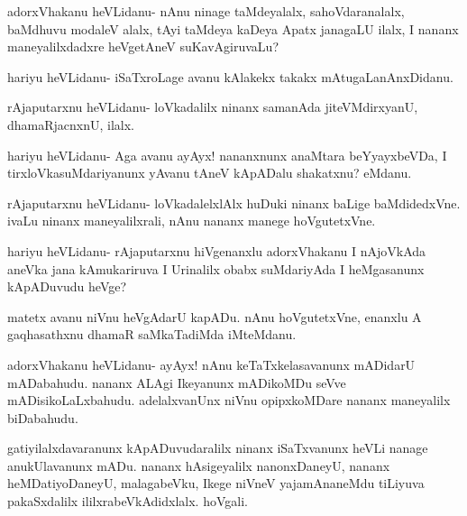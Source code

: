 \documentclass{article}
\begin{document}
\begin{mng}%
adorxVhakanu heVLidanu- nAnu ninage taMdeyalalx, sahoVdaranalalx,
baMdhuvu modaleV alalx, tAyi taMdeya kaDeya Apatx janagaLU ilalx,
I nananx maneyalilxdadxre heVgetAneV suKavAgiruvaLu?
\end{mng}

\begin{mng}%
hariyu heVLidanu- iSaTxroLage avanu kAlakekx takakx mAtugaLanAnxDidanu.
\end{mng}

\begin{mng}%
rAjaputarxnu heVLidanu- loVkadalilx ninanx samanAda jiteVMdirxyanU, dhamaRjacnxnU, ilalx.
\end{mng}

\begin{mng}%
hariyu heVLidanu- Aga avanu ayAyx! nananxnunx anaMtara
beYyayxbeVDa, I tirxloVkasuMdariyanunx yAvanu tAneV kApADalu shakatxnu? eMdanu.
\end{mng}

\begin{mng}%
rAjaputarxnu heVLidanu- loVkadalelxlAlx huDuki ninanx baLige
baMdidedxVne. ivaLu ninanx maneyalilxrali, nAnu nananx manege hoVgutetxVne.
\end{mng}

\begin{mng}%
hariyu heVLidanu- rAjaputarxnu hiVgenanxlu adorxVhakanu
I nAjoVkAda aneVka jana kAmukariruva I Urinalilx obabx 
suMdariyAda I heMgasanunx kApADuvudu heVge?
\end{mng}

\begin{mng}%
matetx avanu niVnu heVgAdarU kapADu. nAnu hoVgutetxVne, 
enanxlu A gaqhasathxnu dhamaR saMkaTadiMda iMteMdanu.
\end{mng}

\begin{mng}%
adorxVhakanu heVLidanu- ayAyx! nAnu keTaTxkelasavanunx 
mADidarU mADabahudu. nananx ALAgi Ikeyanunx mADikoMDu seVve
mADisikoLaLxbahudu. adelalxvanUnx niVnu opipxkoMDare nananx maneyalilx
biDabahudu.
\end{mng}

\begin{mng}%
gatiyilalxdavaranunx kApADuvudaralilx ninanx iSaTxvanunx heVLi
nanage anukUlavanunx mADu. nananx hAsigeyalilx nanonxDaneyU, nananx
heMDatiyoDaneyU, malagabeVku, Ikege niVneV yajamAnaneMdu tiLiyuva
pakaSxdalilx ililxrabeVkAdidxlalx. hoVgali.
\end{mng}
\end{document}
